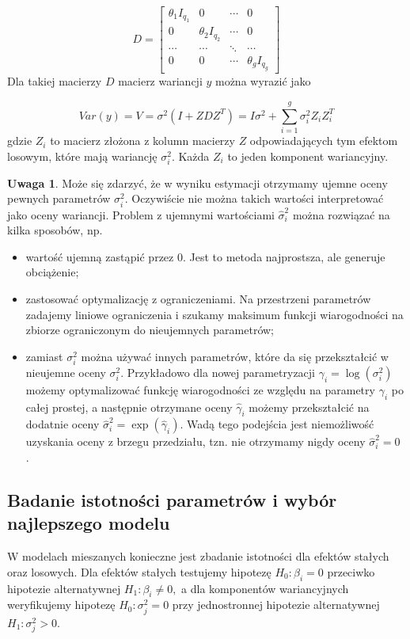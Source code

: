 \documentclass[12pt]{mwbk}
\theoremstyle{plain}
\theoremstyle{definition}
\theoremstyle{definition}
\newtheorem{uwaga}{Uwaga}[chapter]
\begin{document}
$$D=\begin{bmatrix}
\theta_1I_{q_1} & 0 & \cdots & 0 \\
0 & \theta_2I_{q_2} & \cdots & 0 \\
\cdots & \cdots & \ddots & \cdots \\
0 & 0 & \cdots & \theta_gI_{q_g}
\end{bmatrix}$$
Dla takiej macierzy $D$ macierz wariancji $y$ można wyrazić jako

$$Var(y)=V=\sigma^2(I+ZDZ^T)=I\sigma^2+\sum_{i=1}^{g}\sigma_i^2Z_iZ_i^T$$
gdzie $Z_i$ to macierz złożona z kolumn macierzy $Z$ odpowiadających tym efektom losowym, które mają wariancję $\sigma^2_i$. Każda $Z_i$ to jeden komponent wariancyjny.

\begin{uwaga}
	Może się zdarzyć, że w wyniku estymacji otrzymamy ujemne oceny pewnych parametrów $\sigma_i^2$. Oczywiście nie można takich wartości interpretować jako oceny wariancji. Problem z ujemnymi wartościami $\hat{\sigma}^2_i$ można rozwiązać na kilka sposobów, np.
	\begin{itemize}
		\item wartość ujemną zastąpić przez 0. Jest to metoda najprostsza, ale generuje obciążenie;
		\item zastosować optymalizację z ograniczeniami. Na przestrzeni parametrów zadajemy liniowe ograniczenia i szukamy maksimum funkcji wiarogodności na zbiorze ograniczonym do nieujemnych parametrów;
		\item zamiast $\sigma_i^2$ można używać innych parametrów, które da się przekształcić w nieujemne oceny $\sigma^2_i$. Przykładowo dla nowej parametryzacji $\gamma_i=\log(\sigma^2_i)$ możemy optymalizować funkcję wiarogodności ze względu na parametry $\gamma_i$ po całej prostej, a następnie otrzymane oceny $\hat{\gamma}_i$ możemy przekształcić na dodatnie oceny $\hat{\sigma}_i^2=\exp(\hat{\gamma}_i)$. Wadą tego podejścia jest niemożliwość uzyskania oceny z brzegu przedziału, tzn. nie otrzymamy nigdy oceny $\hat{\sigma}^2_i=0$ \cite{biecek}.
	\end{itemize}
\end{uwaga}


\subsection{Badanie istotności parametrów i wybór najlepszego modelu}

W modelach mieszanych konieczne jest zbadanie istotności dla efektów stałych oraz losowych. Dla efektów stałych testujemy hipotezę $H_0: \beta_i=0$ przeciwko hipotezie alternatywnej $H_1: \beta_i \neq 0,$ a dla komponentów wariancyjnych weryfikujemy hipotezę $H_0: \sigma^2_j=0$ przy jednostronnej hipotezie alternatywnej  $H_1: \sigma^2_j>0.$ 
\end{document}
